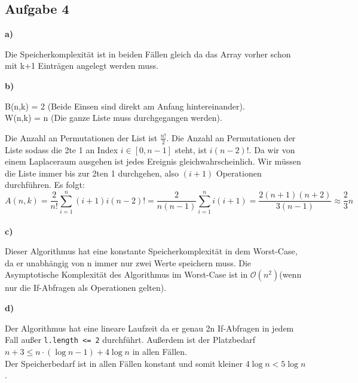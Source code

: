 \documentclass[a4paper,graphics,11pt]{article}
\newcommand{\aufgabe}[1]{\subsection*{Aufgabe #1}}
\begin{document}
\aufgabe{4}
\textbf{a)}

Die Speicherkomplexität ist in beiden Fällen gleich da das Array vorher schon mit k+1 Einträgen angelegt werden muss.

\textbf{b)}

B(n,k) = 2 \quad (Beide Einsen sind direkt am Anfang hintereinander).\\
W(n,k) = n  \quad (Die ganze Liste muss durchgegangen werden).

Die Anzahl an Permutationen der List ist $\frac{n!}{2}$.
Die Anzahl an Permutationen der Liste sodass die 2te 1 an Index $i \in [0, n-1]$ steht, ist
$i(n - 2)!$. Da wir von einem Laplaceraum ausgehen ist jedes Ereignis gleichwahrscheinlich. Wir müssen die Liste
immer bis zur 2ten 1 durchgehen, also $(i+1)$ Operationen durchführen. Es folgt:
$$
    A(n,k) = \frac{2}{n!}\sum_{i=1}^{n}(i+1) i(n-2)!
    = \frac{2}{n(n-1)} \sum_{i=1}^{n} i(i+1)
    = \frac{2(n+1)(n+2)}{3(n-1)} \approx \frac{2}{3}n
$$
\\

\textbf{c)}




Dieser Algorithmus hat eine konstante Speicherkomplexität in dem Worst-Case, da er unabhängig von n immer nur zwei Werte speichern muss.
Die Asymptotische Komplexität des Algorithmus im Worst-Case ist in $\mathcal{O}(n^2)$(wenn nur die If-Abfragen als Operationen gelten).

\newpage
\textbf{d)}


Der Algorithmus hat eine lineare Laufzeit da er genau 2n If-Abfragen in jedem Fall außer \texttt{l.length <= 2} durchführt.
Außerdem ist der Platzbedarf $n + 3 \le n\cdot(\log n-1 )+ 4\log n$ in allen Fällen.\\[50pt]



Der Speicherbedarf ist in allen Fällen konstant und somit kleiner $4\log n < 5 \log n$.
 
\end{document}
